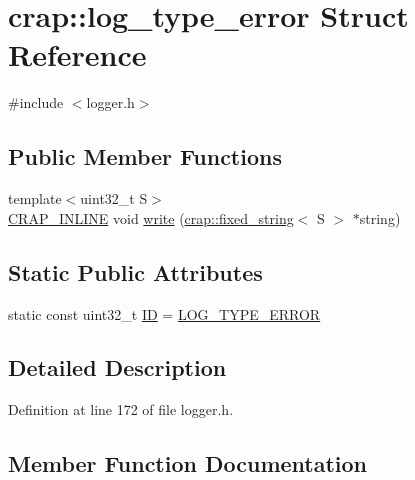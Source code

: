 \hypertarget{structcrap_1_1log__type__error}{}\section{crap\+:\+:log\+\_\+type\+\_\+error Struct Reference}
\label{structcrap_1_1log__type__error}


{\ttfamily \#include $<$logger.\+h$>$}

\subsection*{Public Member Functions}
\begin{DoxyCompactItemize}
\item 
{\footnotesize template$<$uint32\+\_\+t S$>$ }\\\hyperlink{config__x86_8h_a5a40526b8d842e7ff731509998bb0f1c}{C\+R\+A\+P\+\_\+\+I\+N\+L\+I\+N\+E} void \hyperlink{structcrap_1_1log__type__error_a5753a8d8d91fae170d08ceb5ae54fb2a}{write} (\hyperlink{classcrap_1_1fixed__string}{crap\+::fixed\+\_\+string}$<$ S $>$ $\ast$string)
\end{DoxyCompactItemize}
\subsection*{Static Public Attributes}
\begin{DoxyCompactItemize}
\item 
static const uint32\+\_\+t \hyperlink{structcrap_1_1log__type__error_a3823e5526fc4fc5b1ee65ad9f32d31ee}{I\+D} = \hyperlink{logger_8h_a7c5fd30f5e43b34be24326642d1a4c6d}{L\+O\+G\+\_\+\+T\+Y\+P\+E\+\_\+\+E\+R\+R\+O\+R}
\end{DoxyCompactItemize}


\subsection{Detailed Description}


Definition at line 172 of file logger.\+h.



\subsection{Member Function Documentation}
\hypertarget{structcrap_1_1log__type__error_a5753a8d8d91fae170d08ceb5ae54fb2a}{}
